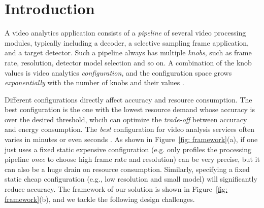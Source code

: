 \section{Introduction}

\label{Section: introduction}
A video analytics application consists of a \emph{pipeline} of several video processing modules, typically including a decoder, a selective sampling frame application, and a target detector. Such a pipeline always has multiple \emph{knobs}, such as frame rate, resolution,  detector model selection and so on. A combination of the knob values is video analytics \emph{configuration}, and the configuration space grows \emph{exponentially} with the number of knobs and their values \cite{jiang2018chameleon}.

Different configurations directly affect accuracy and resource consumption. The best configuration is the one with the lowest resource demand whose accuracy is over the desired threshold, whcih can optimize the \emph{trade-off} between accuracy and energy consumption. The \emph{best} configuration for video analysis services often varies in minutes or even seconds \cite{jiang2018chameleon}. As shown in Figure~\ref{fig: framework}(a), if one just uses a fixed static expensive configuration (e.g. only profiles the processing pipeline \emph{once} to choose high frame rate and resolution) can be very precise, but it can also be a huge drain on resource consumption. Similarly, specifying a fixed static cheap configuration (e.g., low resolution and small model) will significantly reduce accuracy. The framework of our solution %
is shown in Figure~\ref{fig: framework}(b), and we tackle the following design challenges.


